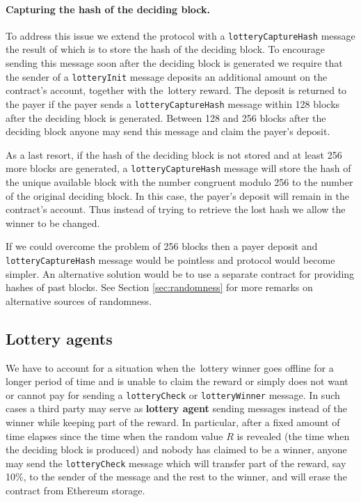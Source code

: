 \documentclass[a4paper]{article}
\begin{document}
    \paragraph{Capturing the hash of the deciding block.}

    To address this issue we extend the protocol with a \texttt{lotteryCaptureHash} message the result of which is to
    store the hash of the deciding block. To encourage sending this message soon after the deciding block is generated
    we require that the sender of a \texttt{lotteryInit} message deposits an additional amount on the contract's
    account, together with the~lottery reward. The deposit is returned to the payer if the payer sends a
    \texttt{lotteryCaptureHash} message within 128 blocks after the deciding block is generated.
    Between 128 and 256 blocks after the deciding block anyone may send this message and claim the payer's deposit.

    As a last resort, if the hash of the deciding block is not stored and at least 256 more blocks are generated,
    a \texttt{lotteryCaptureHash} message will store the hash of the unique available block with the number congruent
    modulo 256 to the number of the original deciding block. In this case, the payer's deposit will remain in the
    contract's account. Thus instead of trying to retrieve the lost hash we allow the winner to be changed.

    If we could overcome the problem of 256 blocks then a payer deposit and \texttt{lotteryCaptureHash} message would
    be pointless and protocol would become simpler. An alternative solution would be to use a separate contract
    for providing hashes of past blocks. See Section \ref{sec:randomness} for more remarks on alternative sources
    of randomness.
\subsection{Lottery agents}
    We have to account for a situation when the~lottery winner goes offline for a longer period of time and is
    unable to claim the reward or simply does not want or cannot pay for sending a \texttt{lotteryCheck} or
    \texttt{lotteryWinner} message. In such cases a third party may serve as \textbf{lottery agent} sending messages
    instead of the winner while keeping part of the reward. In particular, after a fixed amount of time elapses
    since the time when the random value $R$ is revealed (the time when the deciding block is produced) and nobody has
    claimed to be a winner, anyone may send the \texttt{lotteryCheck} message which will transfer part of the reward,
    say 10\%, to the sender of the message and the rest to the winner, and will erase the contract from Ethereum
    storage.
\end{document}
